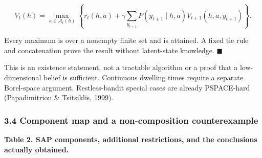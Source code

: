 \documentclass[
  11pt]{article}
\begin{document}
\[V_t(h)=\max_{a\in\mathcal A_t(h)}\left\{r_t(h,a)+\gamma\sum_{y_{t+1}}P(y_{t+1}\mid h,a)V_{t+1}(h,a,y_{t+1})\right\}.\]

Every maximum is over a nonempty finite set and is attained. A fixed tie
rule and concatenation prove the result without latent-state knowledge.
\(\blacksquare\)

This is an existence statement, not a tractable algorithm or a proof
that a low-dimensional belief is sufficient. Continuous dwelling times
require a separate Borel-space argument. Restless-bandit special cases
are already PSPACE-hard (Papadimitriou \& Tsitsiklis, 1999).

\subsubsection{3.4 Component map and a non-composition
counterexample}\label{component-map-and-a-non-composition-counterexample}

\textbf{Table 2. SAP components, additional restrictions, and the
conclusions actually obtained.}
\end{document}

